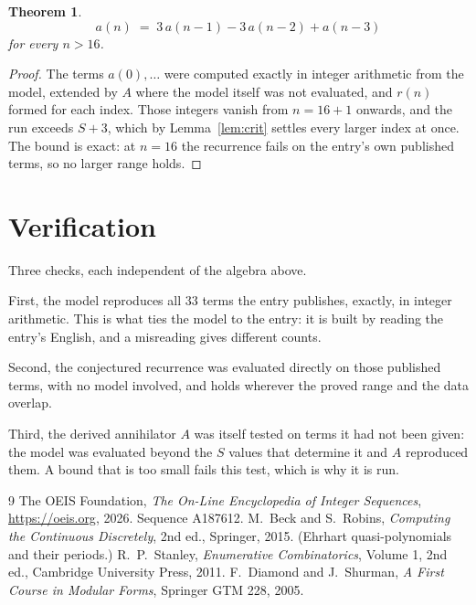 \documentclass[11pt,a4paper]{article}
\theoremstyle{plain}
\newtheorem{theorem}{Theorem}
\theoremstyle{definition}
\begin{document}
\begin{theorem}
\[
a(n)\;=\;3\,a(n-1) - 3\,a(n-2) + a(n-3)
\]
for every $n>16$.
\end{theorem}

\begin{proof}
The terms $a(0),\dots$ were computed exactly in integer arithmetic from the model, extended by
$A$ where the model itself was not evaluated, and $r(n)$ formed for each index. Those integers
vanish from $n=16+1$ onwards, and the run exceeds $S+3$, which by
Lemma~\ref{lem:crit} settles every larger index at once. The bound is exact: at $n=16$ the recurrence fails on the entry's own published terms, so no larger range holds.
\end{proof}

\section{Verification}

Three checks, each independent of the algebra above.

First, the model reproduces all $33$ terms the entry publishes, exactly, in integer
arithmetic. This is what ties the model to the entry: it is built by reading the entry's
English, and a misreading gives different counts.

Second, the conjectured recurrence was evaluated directly on those published terms, with no
model involved, and holds wherever the proved range and the data overlap.

Third, the derived annihilator $A$ was itself tested on terms it had not been given: the model
was evaluated beyond the $S$ values that determine it and $A$ reproduced them. A bound that is
too small fails this test, which is why it is run.

\begin{thebibliography}{9}
 The OEIS Foundation, \emph{The On-Line Encyclopedia of Integer
Sequences}, \url{https://oeis.org}, 2026. Sequence A187612.
 M.~Beck and S.~Robins, \emph{Computing the Continuous Discretely},
2nd ed., Springer, 2015. (Ehrhart quasi-polynomials and their periods.)
 R.~P.~Stanley, \emph{Enumerative Combinatorics}, Volume 1, 2nd ed.,
Cambridge University Press, 2011.
 F.~Diamond and J.~Shurman, \emph{A First Course in Modular Forms},
Springer GTM 228, 2005.
\end{thebibliography}
\end{document}
